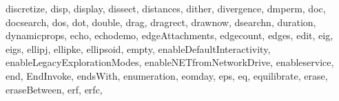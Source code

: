 {{        discretize,%
        disp,%
        display,%
        dissect,%
        distances,%
        dither,%
        divergence,%
        dmperm,%
        doc,%
        docsearch,%
        dos,%
        dot,%
        double,%
        drag,%
        dragrect,%
        drawnow,%
        dsearchn,%
        duration,%
        dynamicprops,%
        echo,%
        echodemo,%
        edgeAttachments,%
        edgecount,%
        edges,%
        edit,%
        eig,%
        eigs,%
        ellipj,%
        ellipke,%
        ellipsoid,%
        empty,%
        enableDefaultInteractivity,%
        enableLegacyExplorationModes,%
        enableNETfromNetworkDrive,%
        enableservice,%
        end,%
        EndInvoke,%
        endsWith,%
        enumeration,%
        eomday,%
        eps,%
        eq,%
        equilibrate,%
        erase,%
        eraseBetween,%
        erf,%
        erfc,%
}}
